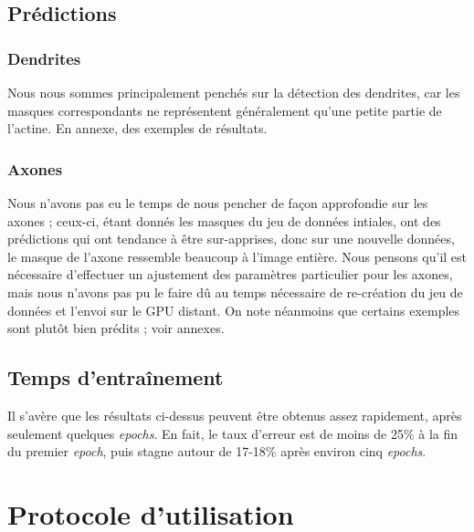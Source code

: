 \documentclass{report}
\begin{document}
\section{Prédictions}

\subsection{Dendrites}

Nous nous sommes principalement penchés sur la détection des dendrites, car les
masques correspondants ne représentent généralement qu'une petite partie de l'actine.
En annexe, des exemples de résultats.

\subsection{Axones}

Nous n'avons pas eu le temps de nous pencher de façon approfondie sur les axones ;
ceux-ci, étant donnés les masques du jeu de données intiales, ont des prédictions qui
ont tendance à être sur-apprises, donc sur une nouvelle données, le masque de l'axone
ressemble beaucoup à l'image entière. Nous pensons qu'il est nécessaire d'effectuer
un ajustement des paramètres particulier pour les axones, mais nous n'avons pas
pu le faire dû au temps nécessaire de re-création du jeu de données et l'envoi
sur le GPU distant. On note néanmoins que certains exemples sont plutôt bien prédits ;
voir annexes.

\section{Temps d'entraînement}

Il s'avère que les résultats ci-dessus peuvent être obtenus assez rapidement, après
seulement quelques \textit{epochs}. En fait, le taux d'erreur est de moins de 25\%
à la fin du premier \textit{epoch}, puis stagne autour de 17-18\% après environ cinq
\textit{epochs}.

\chapter{Protocole d'utilisation}
\end{document}

